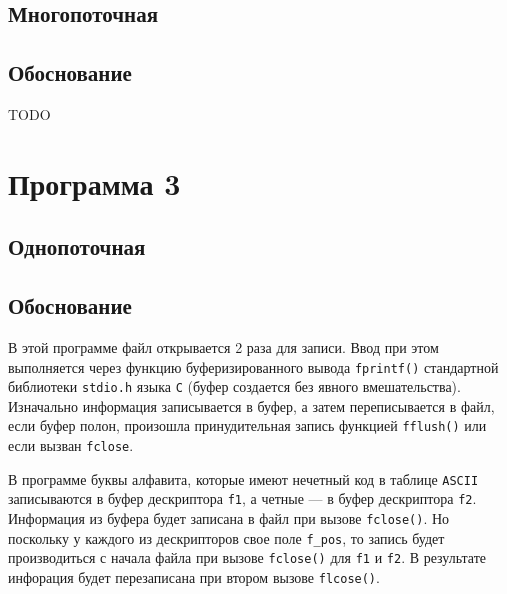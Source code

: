 \subsection{Многопоточная}

\begin{center}
    \captionsetup{justification=raggedright,singlelinecheck=off}
    
\end{center}


\subsection{Обоснование}

TODO





\section{Программа 3}

\subsection{Однопоточная}

\begin{center}
    \captionsetup{justification=raggedright,singlelinecheck=off}
    
\end{center}


\subsection{Обоснование}

В этой программе файл открывается 2 раза для записи. Ввод при этом выполняется через функцию буферизированного вывода \texttt{fprintf()} стандартной библиотеки \texttt{stdio.h} языка \texttt{С} (буфер создается без явного вмешательства). Изначально информация записывается в буфер, а затем переписывается в файл, если буфер полон, произошла принудительная запись функцией \texttt{fflush()} или если вызван \texttt{fclose}.

В программе буквы алфавита, которые имеют нечетный код в таблице \texttt{ASCII} записываются в буфер дескриптора \texttt{f1}, а четные --- в буфер дескриптора \texttt{f2}. Информация из буфера будет записана в файл при вызове \texttt{fclose()}. Но поскольку у каждого из дескрипторов свое поле \texttt{f\_pos}, то запись будет производиться с начала файла при вызове \texttt{fclose()} для \texttt{f1} и \texttt{f2}. В результате инфорация будет перезаписана при втором вызове \texttt{flcose()}.

